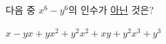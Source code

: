 다음 중 $x^6-y^6$의 인수가 \underline{아닌} 것은?
\begin{choices32}{$x-y$}{$x+y$}{$x^2+y^2$}{$x^2+xy+y^2$}{$x^3+y^3$}\end{choices32}
